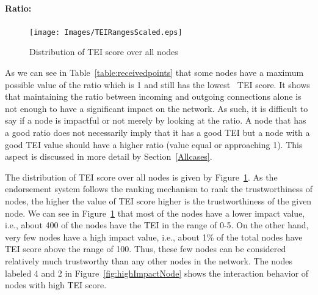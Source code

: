 \paragraph{Ratio:} \label{par:ratio}
\begin{figure}[H]
	\texttt{[image: Images/TEIRangesScaled.eps]}
	\caption{Distribution of \ac{TEI} score over all nodes}
	\label{table:totalimpact}
\end{figure}
As we can see in Table~\ref{table:receivedpoints} that some nodes have a
maximum possible value of the ratio which is 1 and still has the lowest
~\ac{TEI} score. It shows that maintaining the ratio between incoming and
outgoing connections alone is not enough to have a significant impact on the
network. As such, it is difficult to say if a node is impactful or not merely
by looking at the ratio. A node that has a good ratio does not necessarily
imply that it has a good \ac{TEI} but a node with a good \ac{TEI} value should
have a higher ratio (value equal or approaching 1). This aspect is discussed in
more detail by Section~\ref{Allcases}. \par The distribution of \ac{TEI} score
over all nodes is given by Figure~\ref{table:totalimpact}. As the endorsement
system follows the ranking mechanism to rank the trustworthiness of nodes, the
higher the value of \ac{TEI} score higher is the trustworthiness of the given
node. We can see in Figure~\ref{table:totalimpact} that most of the nodes
have a lower impact value, i.e., about 400 of the nodes have the \ac{TEI} in
the range of 0-5. On the other hand, very few nodes have a high impact value,
i.e., about 1\% of the total nodes have \ac{TEI} score above the range of 100.
Thus, these few nodes can be considered relatively much trustworthy than any
other nodes in the network. The nodes labeled 4 and 2 in
Figure~\ref{fig:highImpactNode} shows the interaction behavior of nodes with
high \ac{TEI} score. 
